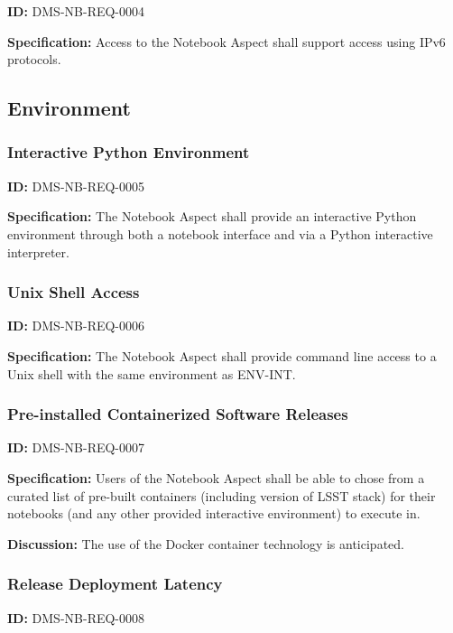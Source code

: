 \documentclass[SE,toc,lsstdraft]{lsstdoc}
\begin{document}
\label{DMS-NB-REQ-0004}
\textbf{ID:} DMS-NB-REQ-0004

\textbf{Specification:}
Access to the Notebook Aspect shall support access using IPv6 protocols.

\subsection{Environment}

\subsubsection{Interactive Python Environment}

\label{DMS-NB-REQ-0005}
\textbf{ID:} DMS-NB-REQ-0005

\textbf{Specification:}
The Notebook Aspect shall provide an interactive Python environment through both a notebook interface and via a Python interactive interpreter.

\subsubsection{Unix Shell Access}

\label{DMS-NB-REQ-0006}
\textbf{ID:} DMS-NB-REQ-0006

\textbf{Specification:}
The Notebook Aspect shall provide command line access to a Unix shell with the same environment as ENV-INT.

\subsubsection{Pre-installed Containerized Software Releases}

\label{DMS-NB-REQ-0007}
\textbf{ID:} DMS-NB-REQ-0007

\textbf{Specification:}
Users of the Notebook Aspect shall be able to chose from a curated list of pre-built containers (including version of LSST stack) for their notebooks (and any other provided interactive environment) to execute in.

\textbf{Discussion:}
The use of the Docker container technology is anticipated.

\subsubsection{Release Deployment Latency}

\label{DMS-NB-REQ-0008}
\textbf{ID:} DMS-NB-REQ-0008
\end{document}
